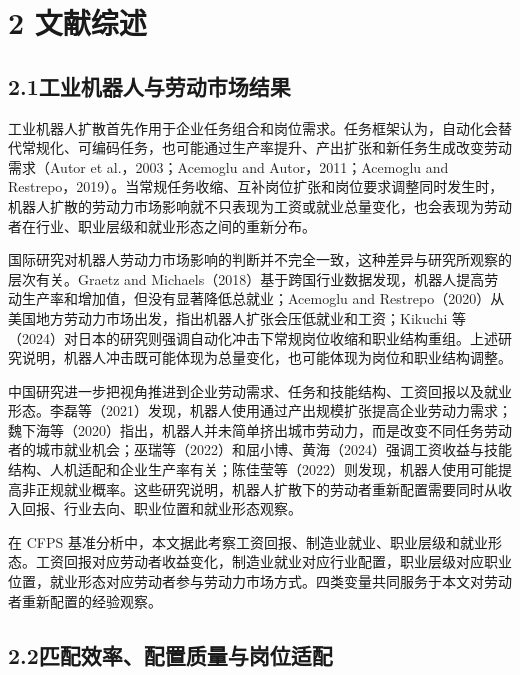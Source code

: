 \section{2 文献综述}\label{ux6587ux732eux7efcux8ff0}

\subsection{2.1工业机器人与劳动市场结果}\label{ux5de5ux4e1aux673aux5668ux4ebaux4e0eux52b3ux52a8ux5e02ux573aux7ed3ux679c}

工业机器人扩散首先作用于企业任务组合和岗位需求。任务框架认为，自动化会替代常规化、可编码任务，也可能通过生产率提升、产出扩张和新任务生成改变劳动需求（Autor et al.，2003；Acemoglu and Autor，2011；Acemoglu and Restrepo，2019）。当常规任务收缩、互补岗位扩张和岗位要求调整同时发生时，机器人扩散的劳动力市场影响就不只表现为工资或就业总量变化，也会表现为劳动者在行业、职业层级和就业形态之间的重新分布。

国际研究对机器人劳动力市场影响的判断并不完全一致，这种差异与研究所观察的层次有关。Graetz and Michaels（2018）基于跨国行业数据发现，机器人提高劳动生产率和增加值，但没有显著降低总就业；Acemoglu and Restrepo（2020）从美国地方劳动力市场出发，指出机器人扩张会压低就业和工资；Kikuchi 等（2024）对日本的研究则强调自动化冲击下常规岗位收缩和职业结构重组。上述研究说明，机器人冲击既可能体现为总量变化，也可能体现为岗位和职业结构调整。

中国研究进一步把视角推进到企业劳动需求、任务和技能结构、工资回报以及就业形态。李磊等（2021）发现，机器人使用通过产出规模扩张提高企业劳动力需求；魏下海等（2020）指出，机器人并未简单挤出城市劳动力，而是改变不同任务劳动者的城市就业机会；巫瑞等（2022）和屈小博、黄海（2024）强调工资收益与技能结构、人机适配和企业生产率有关；陈佳莹等（2022）则发现，机器人使用可能提高非正规就业概率。这些研究说明，机器人扩散下的劳动者重新配置需要同时从收入回报、行业去向、职业位置和就业形态观察。

在 CFPS 基准分析中，本文据此考察工资回报、制造业就业、职业层级和就业形态。工资回报对应劳动者收益变化，制造业就业对应行业配置，职业层级对应职业位置，就业形态对应劳动者参与劳动力市场方式。四类变量共同服务于本文对劳动者重新配置的经验观察。

\subsection{2.2匹配效率、配置质量与岗位适配}\label{ux5339ux914dux6548ux7387ux914dux7f6eux8d28ux91cfux4e0eux5c97ux4f4dux9002ux914d}

